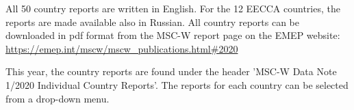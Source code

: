
All 50 country reports are written in English. For the 12 EECCA countries, the reports are made available also in Russian. All country reports can be downloaded in pdf format from the MSC-W report page on the EMEP website:\\
\url{https://emep.int/mscw/mscw_publications.html#2020}

This year, the country reports are found under the header 'MSC-W Data Note 1/2020 Individual Country Reports'. The reports for each country can be selected from a drop-down menu.


\renewcommand\bibname{References}      %

